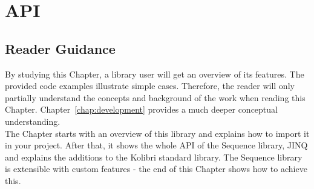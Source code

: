 \chapter{API} %
\label{chap:api}

\section*{Reader Guidance} %
\label{sec:api_reader_guidance}
By studying this Chapter, a library user will get an overview of its features.
The provided code examples illustrate simple cases. Therefore, the reader will
only partially understand the concepts and background of the work when reading
this Chapter. Chapter~\ref{chap:development} provides a much deeper conceptual
understanding. \\ 
The Chapter starts with an overview of this library and explains how to import
it in your project. After that, it shows the whole API of the Sequence library,
JINQ and explains the additions to the Kolibri standard library. The Sequence
library is extensible with custom features - the end of this Chapter shows how
to achieve this.









